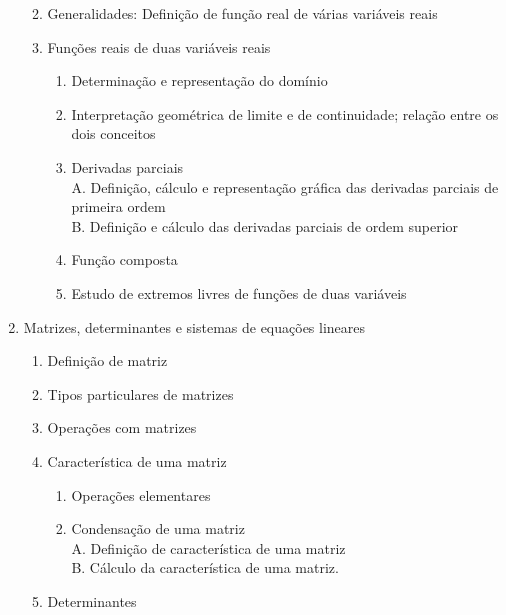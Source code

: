\documentclass[
]{book}
\providecommand{\tightlist}{%
  \setlength{\itemsep}{0pt}\setlength{\parskip}{0pt}}
\begin{document}
\begin{enumerate}
  \begin{enumerate}
  \def\labelenumii{(\alph{enumii})}
  \tightlist
  \item
    Generalidades: Definição de função real de várias variáveis reais\\
  \item
    Funções reais de duas variáveis reais

    \begin{enumerate}
    \def\labelenumiii{\roman{enumiii}.}
    \tightlist
    \item
      Determinação e representação do domínio\\
    \item
      Interpretação geométrica de limite e de continuidade; relação entre os dois conceitos\\
    \item
      Derivadas parciais\\
      A. Definição, cálculo e representação gráfica das derivadas parciais de primeira ordem\\
      B. Definição e cálculo das derivadas parciais de ordem superior\\
    \item
      Função composta\\
    \item
      Estudo de extremos livres de funções de duas variáveis\\
    \end{enumerate}
  \end{enumerate}
\item
  Matrizes, determinantes e sistemas de equações lineares

  \begin{enumerate}
  \def\labelenumii{(\alph{enumii})}
  \tightlist
  \item
    Definição de matriz\\
  \item
    Tipos particulares de matrizes\\
  \item
    Operações com matrizes\\
  \item
    Característica de uma matriz

    \begin{enumerate}
    \def\labelenumiii{\roman{enumiii}.}
    \tightlist
    \item
      Operações elementares\\
    \item
      Condensação de uma matriz\\
      A. Definição de característica de uma matriz\\
      B. Cálculo da característica de uma matriz.\\
    \end{enumerate}
  \item
    Determinantes


\end{enumerate}
\end{enumerate}
\end{document}

